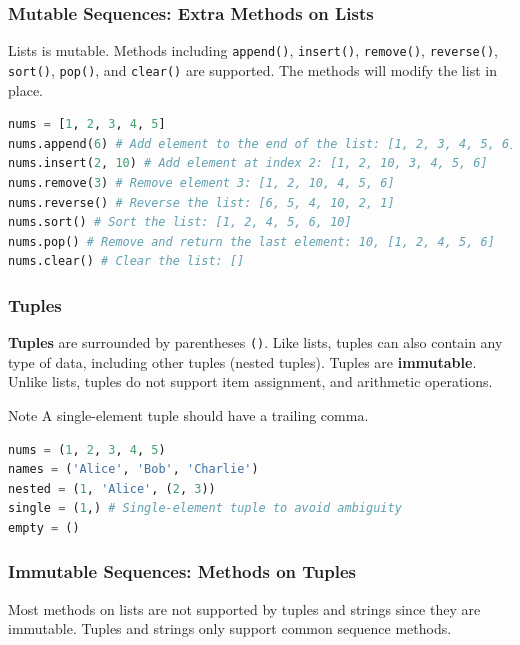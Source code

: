 \documentclass[beamer, en, version=2.0]{huangfusl-template}
\begin{document}
    \begin{frame}[fragile]
        \frametitle{Mutable Sequences: Extra Methods on Lists}

        Lists is mutable. Methods including {\footnotesize\verb|append()|}, {\footnotesize\verb|insert()|}, {\footnotesize\verb|remove()|}, {\footnotesize\verb|reverse()|}, {\footnotesize\verb|sort()|}, {\footnotesize\verb|pop()|}, and {\footnotesize\verb|clear()|} are supported. The methods will modify the list in place.

\begin{lstlisting}[language=python]
nums = [1, 2, 3, 4, 5]
nums.append(6) # Add element to the end of the list: [1, 2, 3, 4, 5, 6]
nums.insert(2, 10) # Add element at index 2: [1, 2, 10, 3, 4, 5, 6]
nums.remove(3) # Remove element 3: [1, 2, 10, 4, 5, 6]
nums.reverse() # Reverse the list: [6, 5, 4, 10, 2, 1]
nums.sort() # Sort the list: [1, 2, 4, 5, 6, 10]
nums.pop() # Remove and return the last element: 10, [1, 2, 4, 5, 6]
nums.clear() # Clear the list: []
\end{lstlisting}
    \end{frame}
    \begin{frame}[fragile]
        \frametitle{Tuples}

        \textbf{Tuples} are surrounded by parentheses {\footnotesize\verb|()|}. Like lists, tuples can also contain any type of data, including other tuples (nested tuples). Tuples are \textbf{immutable}. Unlike lists, tuples do not support item assignment, and arithmetic operations.

        \begin{block}{Note}
            A single-element tuple should have a trailing comma.
        \end{block}

\begin{lstlisting}[language=python]
nums = (1, 2, 3, 4, 5)
names = ('Alice', 'Bob', 'Charlie')
nested = (1, 'Alice', (2, 3))
single = (1,) # Single-element tuple to avoid ambiguity
empty = ()
\end{lstlisting}
    \end{frame}
    \begin{frame}[fragile]
        \frametitle{Immutable Sequences: Methods on Tuples}

        Most methods on lists are not supported by tuples and strings since they are immutable. Tuples and strings only support common sequence methods.
    \end{frame}
\end{document}
